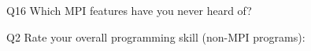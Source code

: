 \begin{description}%
\item{Q16} Which MPI features have you never heard of?%
\item{Q2} Rate your overall programming skill (non-MPI programs):%
\end{description}%

